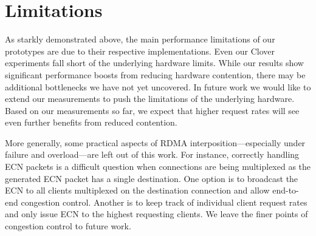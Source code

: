 \section{Limitations}

As starkly demonstrated above, the main performance limitations of
our {\sword} prototypes are due to their respective implementations.
%
Even our Clover experiments fall short of the underlying hardware
limits.  While our results show significant performance boosts from
reducing hardware contention, there may be additional bottlenecks we
have not yet uncovered. In future work we would like to extend our
measurements to push the limitations of the underlying hardware.
Based on our measurements so far, we expect that higher request rates
will see even further benefits from reduced contention.


More generally, some practical aspects of RDMA
interposition---especially under failure and overload---are left out
of this work. For instance, correctly handling ECN packets is a
difficult question when connections are being multiplexed as the
generated ECN packet has a single destination. One option is to
broadcast the ECN to all clients multiplexed on the destination
connection and allow end-to-end congestion control. Another is to keep
track of individual client request rates and only issue ECN to the
highest requesting clients. We leave the finer points of congestion
control to future work.
